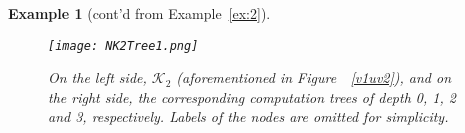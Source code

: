 \documentclass{article}
\newtheorem{example}{Example}
\begin{document}
\begin{example}[cont'd from Example~\ref{ex:2}]
 \begin{figure}
  \centering
  \texttt{[image: NK2Tree1.png]}
  \caption{On the left side,  $\mathcal{K}_2$ (aforementioned in Figure~~\ref{v1uv2}), and on the right side, the corresponding computation trees of depth 0, 1, 2 and 3, respectively. Labels of the nodes are omitted for simplicity.}\label{fig:K2Tree}
\end{figure}



\end{example}
\end{document}
